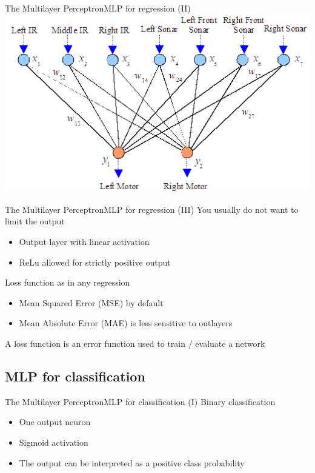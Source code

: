 \documentclass[10pt,compress]{beamer} %
\begin{document}
\begin{frame}{The Multilayer Perceptron}{MLP for regression (II)}
	\centering\includegraphics[width=0.9\linewidth]{figs/robot.png}
\end{frame}

\begin{frame}{The Multilayer Perceptron}{MLP for regression (III)}
	You usually do not want to limit the output
	\begin{itemize}
		\item Output layer with linear activation
		\item ReLu allowed for strictly positive output
	\end{itemize}

	Loss function as in any regression
	\begin{itemize}
		\item Mean Squared Error (MSE) by default
		\item Mean Absolute Error (MAE) is less sensitive to outlayers
	\end{itemize}
	A loss function is an error function used to train / evaluate a network
\end{frame}

\subsection{MLP for classification}

\begin{frame}{The Multilayer Perceptron}{MLP for classification (I)} 
	Binary classification
	\begin{itemize}
		\item One output neuron
		\item Sigmoid activation
		\item The output can be interpreted as a positive class probability
	\end{itemize}

	\centering 
\end{frame}
\end{document}
